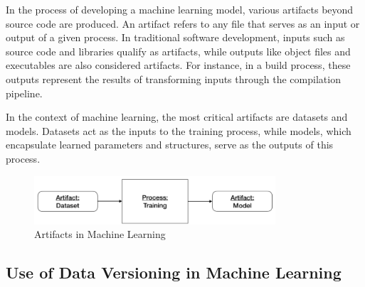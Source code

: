 In the process of developing a machine learning model, 
various artifacts beyond source code are produced. An 
artifact refers to any file that serves as an input or 
output of a given process. In traditional software 
development, inputs such as source code and libraries 
qualify as artifacts, while outputs like object files 
and executables are also considered artifacts. For 
instance, in a build process, these outputs represent 
the results of transforming inputs through the 
compilation pipeline. \cite{wandb, pulicharla2024data}

In the context of machine learning, the most critical 
artifacts are datasets and models. Datasets act as the 
inputs to the training process, while models, which 
encapsulate learned parameters and structures, serve as 
the outputs of this process. \cite{pulicharla2024data}
\begin{figure}[H]
    \centering
    \includegraphics[width=0.8\textwidth]{fig/ml-artifacts.png}
    \caption{Artifacts in Machine Learning \cite{wandb}}
    \label{fig:ml-artifacts}
\end{figure}

\subsection{Use of Data Versioning in Machine Learning}

